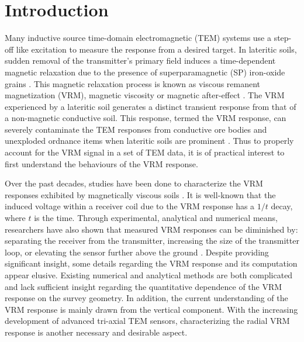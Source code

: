 \documentclass[onecolumn]{IEEEtran} %
\begin{document}
\section{Introduction}
Many inductive source time-domain electromagnetic (TEM) systems use a step-off like excitation to measure the response from a desired target. In lateritic soils, sudden removal of the transmitter's primary field induces a time-dependent magnetic relaxation due to the presence of superparamagnetic (SP) iron-oxide grains \cite{Buselli1982, Barsukov2001,Billings2003,Pasion2007,Zadorozhnaya2012}. This magnetic relaxation process is known as viscous remanent magnetization (VRM), magnetic viscosity or magnetic after-effect \cite{Dabas1992,Neel1949,Moskowitz1985}. The VRM experienced by a lateritic soil generates a distinct transient response from that of a non-magnetic conductive soil. This response, termed the VRM response, can severely contaminate the TEM responses from conductive ore bodies and unexploded ordnance items when lateritic soils are prominent \cite{Butler2003, Billings2003,Pasion2007,Buselli1982,Barsukov2001,Zadorozhnaya2012}. Thus to properly account for the VRM signal in a set of TEM data, it is of practical interest to first understand the behaviours of the VRM response.

Over the past decades, studies have been done to characterize the VRM responses exhibited by magnetically viscous soils \cite{Pasion2002, Butler2003, Billings2003,Pasion2007,Buselli1982,Barsukov2001,Zadorozhnaya2012}.  It is well-known that the induced voltage within a receiver coil due to the VRM  response has a $1/t$ decay, where $t$ is the time. Through experimental, analytical and numerical means, researchers have also shown  that measured VRM responses can be diminished by: separating the receiver from the transmitter, increasing the size of the transmitter loop, or elevating the sensor further above the ground \cite{Lee1984, Buselli1982, Barsukov2001, Das2006, Kozhevnikov2007, Zadorozhnaya2012}. Despite providing significant insight, some details regarding the VRM response and its computation appear elusive. Existing numerical and analytical methods \cite{Billings2003, Kozhevnikov2007, Pasion2007, Barsukov2001,Das2004, Druyts2009, Lee1984, Das2006} are both complicated and lack  sufficient insight regarding the quantitative dependence of the VRM  response on the survey geometry. In addition, the current understanding of the VRM response is mainly drawn from the vertical component. With the increasing development of advanced tri-axial TEM sensors, characterizing the radial VRM response is another necessary and desirable aspect.
\end{document}
